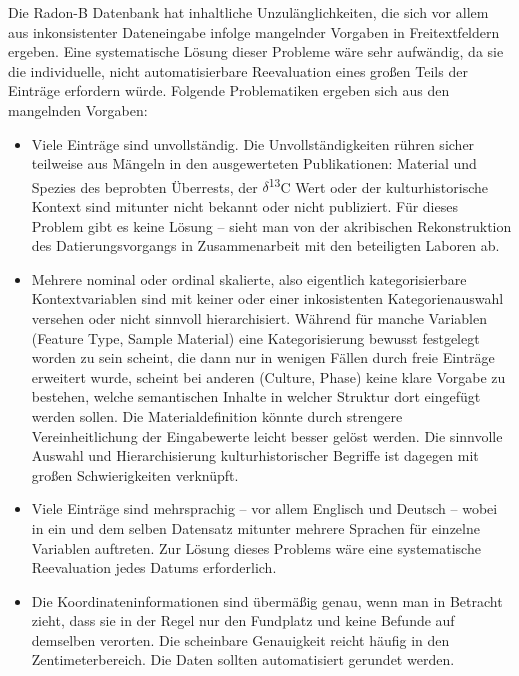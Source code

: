 \documentclass[openany,twoside,twocolumn]{book}
\providecommand{\tightlist}{%
  \setlength{\itemsep}{0pt}\setlength{\parskip}{0pt}}
\begin{document}
Die Radon-B Datenbank hat inhaltliche Unzulänglichkeiten, die sich vor
allem aus inkonsistenter Dateneingabe infolge mangelnder Vorgaben in
Freitextfeldern ergeben. Eine systematische Lösung dieser Probleme wäre
sehr aufwändig, da sie die individuelle, nicht automatisierbare
Reevaluation eines großen Teils der Einträge erfordern würde. Folgende
Problematiken ergeben sich aus den mangelnden Vorgaben:

\begin{itemize}
\tightlist
\item
  Viele Einträge sind unvollständig. Die Unvollständigkeiten rühren
  sicher teilweise aus Mängeln in den ausgewerteten Publikationen:
  Material und Spezies des beprobten Überrests, der
  \(\delta\)\textsuperscript{13}C Wert oder der kulturhistorische
  Kontext sind mitunter nicht bekannt oder nicht publiziert. Für dieses
  Problem gibt es keine Lösung -- sieht man von der akribischen
  Rekonstruktion des Datierungsvorgangs in Zusammenarbeit mit den
  beteiligten Laboren ab.
\item
  Mehrere nominal oder ordinal skalierte, also eigentlich
  kategorisierbare Kontextvariablen sind mit keiner oder einer
  inkosistenten Kategorienauswahl versehen oder nicht sinnvoll
  hierarchisiert. Während für manche Variablen (Feature Type, Sample
  Material) eine Kategorisierung bewusst festgelegt worden zu sein
  scheint, die dann nur in wenigen Fällen durch freie Einträge erweitert
  wurde, scheint bei anderen (Culture, Phase) keine klare Vorgabe zu
  bestehen, welche semantischen Inhalte in welcher Struktur dort
  eingefügt werden sollen. Die Materialdefinition könnte durch strengere
  Vereinheitlichung der Eingabewerte leicht besser gelöst werden. Die
  sinnvolle Auswahl und Hierarchisierung kulturhistorischer Begriffe ist
  dagegen mit großen Schwierigkeiten verknüpft.
\item
  Viele Einträge sind mehrsprachig -- vor allem Englisch und Deutsch --
  wobei in ein und dem selben Datensatz mitunter mehrere Sprachen für
  einzelne Variablen auftreten. Zur Lösung dieses Problems wäre eine
  systematische Reevaluation jedes Datums erforderlich.
\item
  Die Koordinateninformationen sind übermäßig genau, wenn man in
  Betracht zieht, dass sie in der Regel nur den Fundplatz und keine
  Befunde auf demselben verorten. Die scheinbare Genauigkeit reicht
  häufig in den Zentimeterbereich. Die Daten sollten automatisiert
  gerundet werden.
\end{itemize}
\end{document}
